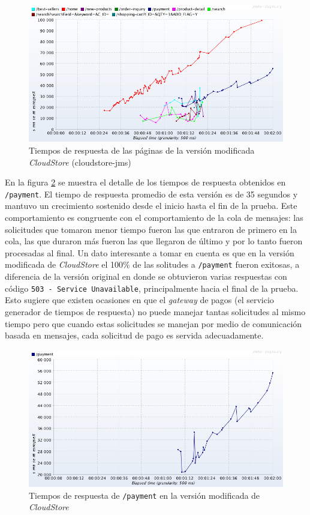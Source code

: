 \documentclass[11pt, twoside]{report}
\begin{document}
\begin{figure}[h]
  \centering
  \includegraphics[width=15cm]{response-over-time-local-to-prod-1}
  \caption{\small{Tiempos de respuesta de las páginas de la versión modificada \emph{CloudStore} (cloudstore-jms)}}
  \label{fig:cs-jms-1}
\end{figure}

En la figura \ref{fig:cs-jms-2} se muestra el detalle de los tiempos de respuesta obtenidos en \texttt{/payment}. El tiempo de respuesta promedio de esta versión es de 35 segundos y mantuvo un crecimiento sostenido desde el inicio hasta el fin de la prueba. Este comportamiento es congruente con el comportamiento de la cola de mensajes: las solicitudes que tomaron menor tiempo fueron las que entraron de primero en la cola, las que duraron más fueron las que llegaron de último y por lo tanto fueron procesadas al final. Un dato interesante a tomar en cuenta es que en la versión modificada de \emph{CloudStore} el 100\% de las solitudes a \texttt{/payment} fueron exitosas, a diferencia de la versión original en donde se obtuvieron varias respuestas con código \texttt{503 - Service Unavailable}, principalmente hacia el final de la prueba. Esto sugiere que existen ocasiones en que el \emph{gateway} de pagos (el servicio generador de tiempos de respuesta) no puede manejar tantas solicitudes al mismo tiempo pero que cuando estas solicitudes se manejan por medio de comunicación basada en mensajes, cada solicitud de pago es servida adecuadamente. 

\begin{figure}[h]
  \centering
  \includegraphics[width=15cm]{response-over-time-local-to-prod-1-payment}
  \caption{\small{Tiempos de respuesta de \texttt{/payment} en la versión modificada de \emph{CloudStore}}}
  \label{fig:cs-jms-2}
\end{figure}
\end{document}
